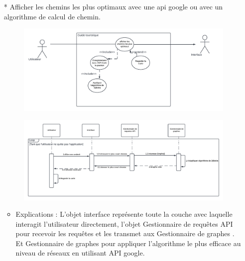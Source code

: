 \documentclass[12pt]{article}
\begin{document}
\begin{itemize}
\begin{itemize}
\end{itemize}
\item[* ]  Afficher les chemins les plus optimaux avec une api google ou avec un algorithme de calcul de chemin.
\begin{figure}[!hbtp]
	\centering
	\includegraphics[scale=0.65]{Capture2_s.PNG}
\end{figure}
\begin{figure}[!hbtp]
	\centering
	\includegraphics[scale=0.65]{Capture2.PNG}
\end{figure}
\begin{itemize}
	\item  Explications : 
	L'objet interface représente toute la couche avec laquelle interagit l'utilisateur directement, l'objet Gestionnaire de requêtes API pour recevoir les requêtes et les transmet aux Gestionnaire de graphes . Et Gestionnaire de graphes pour appliquer l’algorithme le plus efficace au niveau de réseaux en utilisant API google.
	
\end{itemize}
\end{itemize}
\newpage
\end{document}
